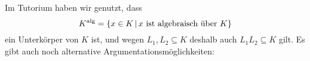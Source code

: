 \section{}





\addtocounter{subsection}{1}





\subsection{}

Im Tutorium haben wir genutzt, dass
\[
    K^\alg
  = \{ 
      x \in K
      \suchthat
      \text{$x$ ist algebraisch über $K$}
    \}
\]
ein Unterkörper von $K$ ist, und wegen $L_1, L_2 \subseteq K$ deshalb auch $L_1 L_2 \subseteq K$ gilt.
Es gibt auch noch alternative Argumentationsmöglichkeiten:

